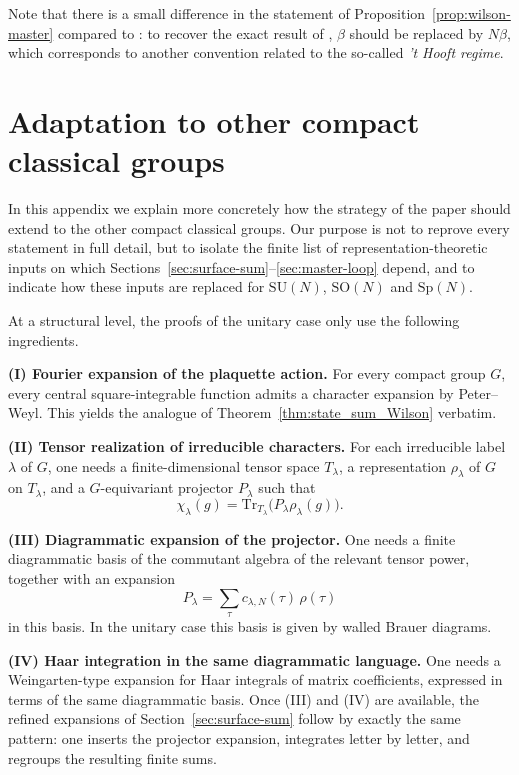 \documentclass[11pt,a4paper,reqno]{article}
\theoremstyle{definition}
\theoremstyle{remark}
\newcommand\SU{{\mathrm{SU}}}
\newcommand\SO{{\mathrm{SO}}}
\newcommand\Sp{{\mathrm{Sp}}}
\newcommand\Tr{\mathrm{Tr}}
\begin{document}
Note that there is a small difference in the statement of Proposition~\ref{prop:wilson-master} compared to \cite{SSZ24}: to recover the exact result of \cite{SSZ24}, $\beta$ should be replaced by $N\beta$, which corresponds to another convention related to the so-called \emph{'t Hooft regime}.

\appendix
\section{Adaptation to other compact classical groups}\label{sec:appendix}

In this appendix we explain more concretely how the strategy of the paper should extend to the other compact classical groups. Our purpose is not to reprove every statement in full detail, but to isolate the finite list of representation-theoretic inputs on which Sections~\ref{sec:surface-sum}--\ref{sec:master-loop} depend, and to indicate how these inputs are replaced for $\SU(N)$, $\SO(N)$ and $\Sp(N)$.

At a structural level, the proofs of the unitary case only use the following ingredients.

\medskip

\noindent
\textbf{(I) Fourier expansion of the plaquette action.}
For every compact group $G$, every central square-integrable function admits a character expansion by Peter--Weyl. This yields the analogue of Theorem~\ref{thm:state_sum_Wilson} verbatim.

\medskip

\noindent
\textbf{(II) Tensor realization of irreducible characters.}
For each irreducible label $\lambda$ of $G$, one needs a finite-dimensional tensor space $T_\lambda$, a representation $\rho_\lambda$ of $G$ on $T_\lambda$, and a $G$-equivariant projector $P_\lambda$ such that
\[
\chi_\lambda(g)=\Tr_{T_\lambda}\!\bigl(P_\lambda \rho_\lambda(g)\bigr).
\]

\medskip

\noindent
\textbf{(III) Diagrammatic expansion of the projector.}
One needs a finite diagrammatic basis of the commutant algebra of the relevant tensor power, together with an expansion
\[
P_\lambda=\sum_{\tau} c_{\lambda,N}(\tau)\,\rho(\tau)
\]
in this basis. In the unitary case this basis is given by walled Brauer diagrams.

\medskip

\noindent
\textbf{(IV) Haar integration in the same diagrammatic language.}
One needs a Weingarten-type expansion for Haar integrals of matrix coefficients, expressed in terms of the same diagrammatic basis. Once (III) and (IV) are available, the refined expansions of Section~\ref{sec:surface-sum} follow by exactly the same pattern: one inserts the projector expansion, integrates
letter by letter, and regroups the resulting finite sums.
\end{document}
